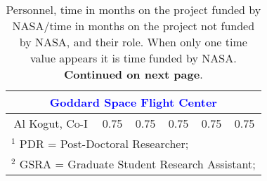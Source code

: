 \documentclass[12pt]{article}
\begin{document}
\begin{table}[h]
\begin{center}
\begin{tabular}{|c|c|c|c|c|c|}
\multicolumn{6}{|c|}{\textcolor{blue}{Goddard Space Flight Center } }  \\ \hline
Al Kogut, Co-I               & 0.75 & 0.75 & 0.75 & 0.75  & 0.75   \\ \hline
\multicolumn{6}{|l|}{ $^{1}$ PDR = Post-Doctoral Researcher; } \\ 
\multicolumn{6}{|l|}{ $^{2}$ GSRA = Graduate Student Research Assistant;  } \\ \hline
\end{tabular}
\end{center}
\vspace{-0.2in}
\caption{ Personnel, time in months on the project funded by NASA/time in months on the project not funded by NASA, and their role.  When 
only one time value appears it is time funded by NASA.  {\bf Continued on next page}.
\label{tab:personnel} }
\end{table}

\newpage
\end{document}
